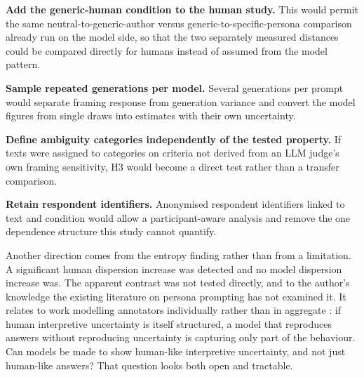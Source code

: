 \textbf{Add the generic-human condition to the human study.} This would permit the same
neutral-to-generic-author versus generic-to-specific-persona comparison already run on the model
side, so that the two separately measured distances could be compared directly for humans instead
of assumed from the model pattern.

\textbf{Sample repeated generations per model.} Several generations per prompt would separate
framing response from generation variance and convert the model figures from single draws into
estimates with their own uncertainty.

\textbf{Define ambiguity categories independently of the tested property.} If texts were assigned
to categories on criteria not derived from an LLM judge's own framing sensitivity, H3 would become
a direct test rather than a transfer comparison.

\textbf{Retain respondent identifiers.} Anonymised respondent identifiers linked to text and
condition would allow a participant-aware analysis and remove the one dependence structure this
study cannot quantify.

Another direction comes from the entropy finding rather than from a limitation. A significant
human dispersion increase was detected and no model dispersion increase was. The apparent
contrast was not tested directly, and to the author's knowledge the existing literature on persona
prompting has not examined it. It relates to work modelling annotators individually rather than in
aggregate \cite{Davani2022Disagreement, Uma2021Survey}: if human interpretive uncertainty is
itself structured, a model that reproduces answers without reproducing uncertainty is capturing
only part of the behaviour. Can models be made to show human-like interpretive uncertainty, and
not just human-like answers? That question looks both open and tractable.
